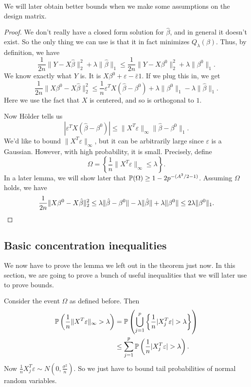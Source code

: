 \documentclass[a4paper]{article}
\begin{document}
We will later obtain better bounds when we make some assumptions on the design matrix.

\begin{proof}
  We don't really have a closed form solution for $\hat{\beta}$, and in general it doesn't exist. So the only thing we can use is that it in fact minimizes $Q_\lambda(\beta)$. Thus, by definition, we have
  \[
    \frac{1}{2n} \|Y - X \hat{\beta}\|_2^2 + \lambda \|\hat{\beta}\|_1 \leq \frac{1}{2n} \|Y - X \beta^0\|^2_2 + \lambda \|\beta^0\|_1.
  \]
  We know exactly what $Y$ is. It is $X \beta^0 + \varepsilon - \bar{\varepsilon} 1$. If we plug this in, we get
  \[
    \frac{1}{2n} \|X \beta^0 - X \hat{\beta}\|_2^2 \leq \frac{1}{n} \varepsilon^T X(\hat{\beta} - \beta^0) + \lambda \|\beta^0\|_1 - \lambda \|\hat{\beta}\|_1.
  \]
  Here we use the fact that $X$ is centered, and so is orthogonal to $1$.

  Now H\"older tells us
  \[
    |\varepsilon^T X (\hat{\beta} - \beta^0)| \leq \|X^T \varepsilon \|_\infty \|\hat{\beta} - \beta^0\|_1.
  \]
  We'd like to bound $\|X^T \varepsilon \|_\infty$, but it can be arbitrarily large since $\varepsilon$ is a Gaussian. However, with high probability, it is small. Precisely, define
  \[
    \Omega = \left\{\frac{1}{n} \|X^T \varepsilon \|_\infty \leq \lambda\right\}.
  \]
  In a later lemma, we will show later that $\P(\Omega) \geq 1 - 2 p^{-(A^2/2 - 1)}$. Assuming $\Omega$ holds, we have
  \[
    \frac{1}{2n} \|X \beta^0 - X \hat{\beta}\|^2_2 \leq \lambda \|\hat{\beta} - \beta^0\| - \lambda \|\hat{\beta}\| + \lambda \|\beta^0\| \leq 2 \lambda \|\beta^0\|_1.\qedhere
  \]
\end{proof}

\subsection{Basic concentration inequalities}
We now have to prove the lemma we left out in the theorem just now. In this section, we are going to prove a bunch of useful inequalities that we will later use to prove bounds.

Consider the event $\Omega$ as defined before. Then
\begin{align*}
  \P\left(\frac{1}{n} \|X^T \varepsilon\|_\infty > \lambda\right) &= \P\left(\bigcup_{j = 1}^p \left\{\frac{1}{n}|X_j^T \varepsilon| > \lambda\right\}\right)\\
  &\leq \sum_{j = 1}^p \P\left(\frac{1}{n} |X_j^T \varepsilon| > \lambda\right).
\end{align*}
Now $\frac{1}{n} X_j^T \varepsilon \sim N(0, \frac{\sigma^2}{n})$. So we just have to bound tail probabilities of normal random variables.
\end{document}
